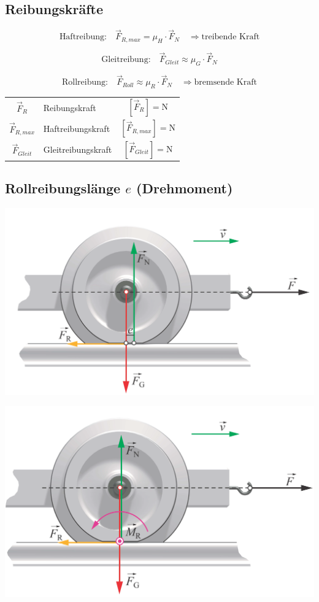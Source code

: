 	\subsection{Reibungskräfte}

		$$ \boxed{ \text{Haftreibung:} \quad  \vec{F}_{R,max} = \mu_H \cdot \vec{F}_N \quad \Rightarrow \text{treibende Kraft} } $$
		
		$$ \boxed{ \text{Gleitreibung:} \quad \vec{F}_{Gleit} \approx \mu_G \cdot \vec{F}_N } $$ 
		
		$$ \boxed{ \text{Rollreibung:} \quad \vec{F}_{Roll} \approx \mu_R \cdot \vec{F}_N \quad \Rightarrow \text{bremsende Kraft} } $$
		
		\begin{tabular}{c l c}
			$\vec{F}_R$ & Reibungskraft & $[\vec{F}_R] = \mathrm{N}$ \\
			$\vec{F}_{R,max}$ & Haftreibungskraft & $[\vec{F}_{R,max}] = \mathrm{N}$ \\
			$\vec{F}_{Gleit}$ & Gleitreibungskraft & $[\vec{F}_{Gleit}] = \mathrm{N}$ \\
		\end{tabular}

	\subsection{Rollreibungslänge $e$ (Drehmoment)}

		\begin{minipage}{0.48\linewidth}
			\includegraphics[width=0.8\linewidth]{Bilder/rollreibung_1} \\
		\end{minipage}
		\hfill
		\begin{minipage}{0.48\linewidth}
			\includegraphics[width=0.8\linewidth]{Bilder/rollreibung_2} \\
		\end{minipage}
		
